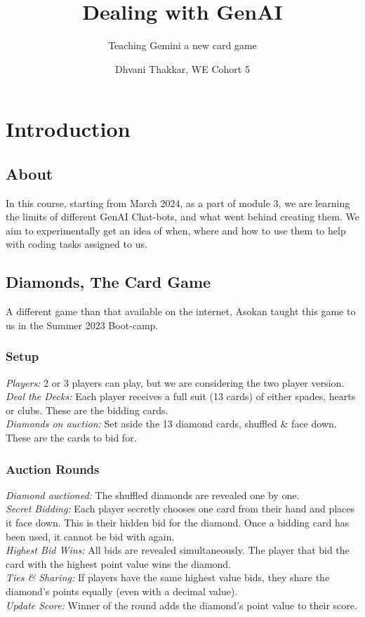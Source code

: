 \documentclass[runningheads]{llncs}
\begin{document}
%
\title{Dealing with GenAI}
%
\subtitle{Teaching Gemini a new card game}
%
\author{Dhvani Thakkar, WE Cohort 5}
%
\maketitle              %
%
\section{Introduction}
\subsection{About}
In this course, starting from March 2024, as a part of module 3, we are learning the limits of different GenAI Chat-bots, and what went behind creating them. We aim to experimentally get an idea of when, where and how to use them to help with coding tasks assigned to us. 

\subsection{Diamonds, The Card Game}
A different game than that available on the internet, Asokan taught this game to us in the Summer 2023 Boot-camp.

\subsubsection{Setup}
\hfill \break
\textit{Players:}
2 or 3 players can play, but we are considering the two player version.\\
\textit{Deal the Decks:}
Each player receives a full suit (13 cards) of either spades, hearts or clubs. These are the bidding cards.\\
\textit{Diamonds on auction:}
 Set aside the 13 diamond cards, shuffled \& face down. These are the cards to bid for.
 
\subsubsection{Auction Rounds}
\hfill \break
\textit{Diamond auctioned:}
 The shuffled diamonds are revealed one by one.\\
\textit{Secret Bidding:}
 Each player secretly chooses one card from their hand and places it face down. This is their hidden bid for the diamond. Once a bidding card has been used, it cannot be bid with again.\\
\textit{Highest Bid Wins:}
 All bids are revealed simultaneously. The player that bid the card with the highest point value wins the diamond.\\
\textit{Ties \& Sharing:}
 If players have the same highest value bids, they share the diamond's points equally (even with a decimal value).\\
\textit{Update Score:}
Winner of the round adds the diamond's point value to their score. \\
\end{document}
